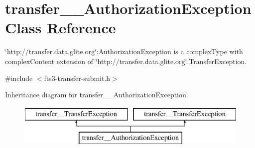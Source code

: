 \section{transfer\_\-\_\-AuthorizationException Class Reference}
\label{classtransfer____AuthorizationException}


\char`\"{}http://transfer.data.glite.org\char`\"{}:AuthorizationException is a complexType with complexContent extension of \char`\"{}http://transfer.data.glite.org\char`\"{}:TransferException.  




{\ttfamily \#include $<$fts3-\/transfer-\/submit.h$>$}

Inheritance diagram for transfer\_\-\_\-AuthorizationException:\begin{figure}[H]
\begin{center}
\leavevmode
\includegraphics[height=2.000000cm]{classtransfer____AuthorizationException}
\end{center}
\end{figure}
